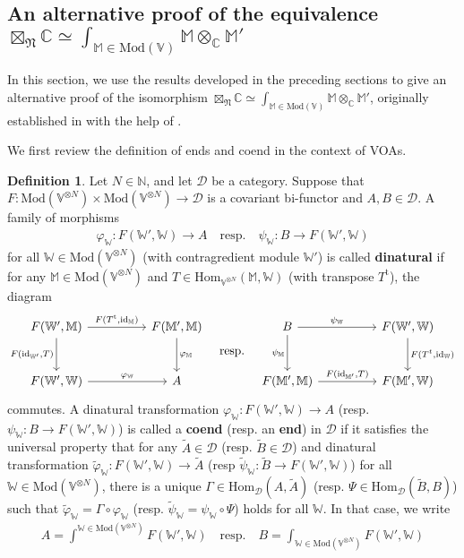\documentclass[11pt,b5paper,notitlepage]{article}
\theoremstyle{definition}
\newtheorem{df}{Definition}[section]
\theoremstyle{plain}
\newcommand{\wtd}{\widetilde}
\newcommand{\tr}{\mathrm{t}} %
\newcommand{\Hom}{\mathrm{Hom}}
\newcommand{\scr}{\mathscr}
\newcommand{\Vbb}{\mathbb V}
\newcommand{\Wbb}{\mathbb W}
\newcommand{\Mbb}{\mathbb M}
\newcommand{\Cbb}{\mathbb C}
\newcommand{\Nbb}{\mathbb N}
\newcommand{\<}{\left\langle}
\renewcommand{\>}{\right\rangle}
\newcommand{\Mod}{\mathrm{Mod}}
\newcommand{\id}{\mathrm{id}}
\newcommand{\fn}{\mathfrak{N}}
\numberwithin{equation}{section}
\begin{document}
\subsection{An alternative proof of the equivalence $\boxtimes_\fn\Cbb\simeq\int_{\Mbb\in\Mod(\Vbb)}\Mbb\otimes_\Cbb\Mbb'$}\label{lb81}

In this section, we use the results developed in the preceding sections to give an alternative proof of the isomorphism $\boxtimes_\fn\Cbb\simeq\int_{\Mbb\in\Mod(\Vbb)}\Mbb\otimes_\Cbb\Mbb'$, originally established in \cite[Sec. 0.6]{GZ3} with the help of \cite{FSS20}.

We first review the definition of ends and coend in the context of VOAs.


\begin{df}\label{lb75}
Let $N\in\Nbb$, and let $\scr D$ be a category. Suppose that $F:\Mod(\Vbb^{\otimes N})\times \Mod(\Vbb^{\otimes N})\rightarrow\scr D$ is a covariant bi-functor and $A,B\in\scr D$. A family of morphisms
\begin{align}
\varphi_\Wbb:F(\Wbb', \Wbb)\rightarrow A\quad \text{resp.}\quad \psi_\Wbb:B\rightarrow F(\Wbb', \Wbb)
\end{align}
for all $\Wbb\in\Mod(\Vbb^{\otimes N})$ (with contragredient module $\Wbb'$) is called \textbf{dinatural} if for any $\Mbb\in\Mod(\Vbb^{\otimes N})$ and $T\in\Hom_{\Vbb^{\otimes N}}(\Mbb,\Wbb)$ (with transpose $T^\tr$), the diagram
\begin{equation*}
\begin{tikzcd}[row sep=large, column sep=huge]
F(\Wbb',\Mbb) \arrow[r,"{F(T^\tr,\id_\Mbb)}"] \arrow[d,"{F(\id_{\Wbb'},T)}"'] & F(\Mbb',\Mbb) \arrow[d,"\varphi_\Mbb"] \\
F(\Wbb',\Wbb) \arrow[r,"\varphi_\Wbb"]           & A         
\end{tikzcd}
\quad\text{resp.}\quad
	\begin{tikzcd}[row sep=large, column sep=huge]
	B \arrow[r,"{\psi_\Wbb}"] \arrow[d,"{\psi_\Mbb}"'] & F(\Wbb',\Wbb) \arrow[d,"{F(T^t,\id_\Wbb)}"] \\
F(\Mbb',\Mbb) \arrow[r,"{F(\id_{\Mbb'},T)}"]           & F(\Mbb',\Wbb)      
	\end{tikzcd}
\end{equation*}
commutes. A dinatural transformation $\varphi_\Wbb:F(\Wbb', \Wbb)\rightarrow A$ (resp. $\psi_\Wbb:B\rightarrow F(\Wbb', \Wbb)$) is called a \textbf{coend} (resp. an \textbf{end}) in $\scr D$ if it satisfies the universal property that for any $\wtd A\in\scr D$ (resp. $\wtd B\in \scr D$) and dinatural transformation $\wtd \varphi_\Wbb:F(\Wbb',\Wbb)\rightarrow \wtd A$ (resp $\wtd \psi_\Wbb:\wtd B\rightarrow F(\Wbb',\Wbb)$) for all $\Wbb\in\Mod(\Vbb^{\otimes N})$, there is a unique $\Gamma\in\Hom_{\scr D}(A,\wtd A)$ (resp. $\Psi\in \Hom_{\scr D}(\wtd B,B)$) such that $\wtd\varphi_\Wbb=\Gamma\circ\varphi_\Wbb$ (resp. $\wtd\psi_\Wbb=\psi_\Wbb\circ \Psi$) holds for all $\Wbb$. In that case, we write
\begin{align*}
A=\int^{\Wbb\in\Mod(\Vbb^{\otimes N})}F(\Wbb',\Wbb)\quad\text{resp.}\quad B=\int_{\Wbb\in\Mod(\Vbb^{\otimes N})}F(\Wbb',\Wbb)
\end{align*}
\end{df}
\end{document}
